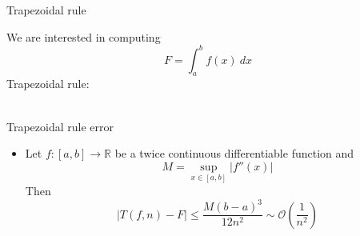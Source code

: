 \documentclass{beamer}
\newcommand{\bitem}{\item[$\bullet$]}
\begin{document}
\begin{frame}{Trapezoidal rule}

We are interested in computing
$$
F=\int_a^b f(x)~dx
$$
Trapezoidal rule:\\
~\\

    
\end{frame}

\begin{frame}{Trapezoidal rule error}

\begin{itemize}
    \bitem Let $f:[a,b] \to \mathbb{R}$ be a twice continuous differentiable function and 
    $$
    M = \sup_{x\in [a,b]} |f''(x)|
    $$
    Then
    $$
    |T(f,n) - F| \leq \frac{M (b-a)^3}{12 n^2} \sim \mathcal{O}\left( \frac{1}{n^2}\right)
    $$
\end{itemize}
    
\end{frame}
\end{document}
